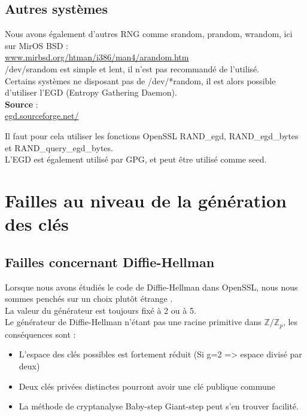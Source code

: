 \documentclass{article}
\begin{document}
	
	
	\subsection{Autres systèmes}
	
		Nous avons également d'autres RNG comme srandom, prandom, wrandom, ici 
		sur MirOS BSD : \\
		\href{https://www.mirbsd.org/htman/i386/man4/arandom.htm}
		{www.mirbsd.org/htman/i386/man4/arandom.htm}\\
		
		/dev/srandom est simple et lent, il n'est pas recommandé de l'utilisé.\\
	
		Certains systèmes ne disposant pas de /dev/*random, il est alors possible
		d'utiliser l'EGD (Entropy Gathering Daemon).\\
		
		\textbf{Source} : \\
		\href{http://egd.sourceforge.net/}{egd.sourceforge.net/}
		
		Il faut pour cela utiliser les fonctions OpenSSL RAND\_egd, RAND\_egd\_bytes
		et RAND\_query\_egd\_bytes. \\
		
		L'EGD est également utilisé par GPG, et peut être utilisé comme seed.

		\newpage








\section{Failles au niveau de la génération des clés}

	\subsection{Failles concernant Diffie-Hellman}
	
	Lorsque nous avons étudiés le code de Diffie-Hellman dans OpenSSL, nous nous
	sommes penchés sur un choix plutôt étrange . \\
	La valeur du générateur est toujours fixé à 2 ou à 5. \\

	Le générateur de Diffie-Hellman n'étant pas une racine primitive dans 
	$\mathbb{Z}/\mathbb{Z}_p$, les conséquences sont :
	\begin{itemize}
	\item L'espace des clés possibles est fortement réduit (Si g=2 => espace 
	divisé par deux)
	\item Deux clés privées distinctes pourront avoir une clé publique commune
	\item La méthode de cryptanalyse Baby-step Giant-step peut s'en trouver 
	facilité.\\
	\end{itemize}
\end{document}
